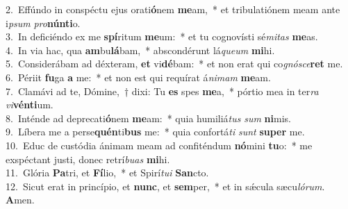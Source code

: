 {2.~}Effúndo in conspéctu ejus orati\textbf{ó}nem \textbf{me}am,~* et tribulatiónem meam ante i\textit{psum} \textit{pro}\textbf{nún}\textbf{ti}o.\\
{3.~}In deficiéndo ex me \textbf{spí}ritum \textbf{me}um:~* et tu cognovísti sé\textit{mi}\textit{tas} \textbf{me}as.\\
{4.~}In via hac, qua \textbf{am}bu\textbf{lá}bam,~* abscondérunt lá\textit{que}\textit{um} \textbf{mi}hi.\\
{5.~}Considerábam ad déxteram, \textbf{et} vi\textbf{dé}bam:~* et non erat qui co\textit{gnó}\textit{sce}\textbf{ret} me.\\
{6.~}Périit \textbf{fu}ga \textbf{a} me:~* et non est qui requírat á\textit{ni}\textit{mam} \textbf{me}am.\\
{7.~}Clamávi ad te, Dómine,~† dixi: Tu \textbf{es} spes \textbf{me}a,~* pórtio mea in ter\textit{ra} \textit{vi}\textbf{vén}\textbf{ti}um.\\
{8.~}Inténde ad deprecati\textbf{ó}nem \textbf{me}am:~* quia humiliá\textit{tus} \textit{sum} \textbf{ni}mis.\\
{9.~}Líbera me a perse\textbf{quén}ti\textbf{bus} me:~* quia confortá\textit{ti} \textit{sunt} \textbf{su}\textbf{per} me.\\
{10.~}Educ de custódia ánimam meam ad confiténdum \textbf{nó}mini \textbf{tu}o:~* me exspéctant justi, donec retrí\textit{bu}\textit{as} \textbf{mi}hi.\\
{11.~}Glória \textbf{Pa}tri, et \textbf{Fí}lio,~* et Spirí\textit{tu}\textit{i} \textbf{San}cto.\\
{12.~}Sicut erat in princípio, et \textbf{nunc}, et \textbf{sem}per,~* et in sǽcula sæcu\textit{ló}\textit{rum}. \textbf{A}men.\\
